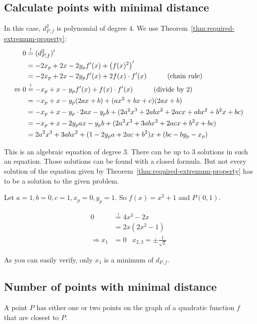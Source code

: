 \subsection{Calculate points with minimal distance}
In this case, $d_{P,f}^2$ is polynomial of degree 4. 
We use Theorem~\ref{thm:required-extremum-property}:\nobreak
\begin{align}
    0     &\overset{!}{=} (d_{P,f}^2)'\\
          &= -2 x_p + 2x -2y_p f'(x) + \left (f(x)^2 \right )'\\
          &= -2 x_p + 2x -2y_p f'(x) + 2 f(x) \cdot f'(x) \rlap{\hspace*{3em}(chain rule)}\label{eq:minimizingFirstDerivative}\\
\Leftrightarrow 0 &\overset{!}{=} -x_p + x -y_p f'(x) + f(x) \cdot f'(x) \rlap{\hspace*{3em}(divide by 2)}\label{eq:minimizingFirstDerivative}\\
          &= -x_p + x -y_p (2ax+b) + (ax^2+bx+c)(2ax+b)\\
          &= -x_p + x -y_p \cdot 2ax- y_p b + (2 a^2 x^3+2 a b x^2+2 a c x+ab x^2+b^2 x+bc)\\
          &= -x_p + x -2y_p ax- y_p b + (2a^2 x^3 + 3 ab x^2 + 2acx + b^2 x + bc)\\
          &= 2a^2 x^3 + 3 ab x^2 + (1 -2y_p a+ 2ac + b^2)x +(bc-by_p-x_p)\label{eq:quadratic-derivative-eq-0}
\end{align}

This is an algebraic equation of degree 3.
There can be up to 3 solutions in such an equation. Those solutions
can be found with a closed formula. But not every solution of the
equation given by Theorem~\ref{thm:required-extremum-property}
has to be a solution to the given problem.

\begin{example}
    Let $a = 1,  b = 0,  c= 1, x_p= 0, y_p = 1$.
    So $f(x) = x^2 + 1$ and $P(0, 1)$.

\begin{align}
    0 &\stackrel{!}{=} 4 x^3 - 2x\\
      &=2x(2x^2 - 1)\\
    \Rightarrow x_1 &= 0 \;\;\; x_{2,3} = \pm \frac{1}{\sqrt{2}}
\end{align}

As you can easily verify, only $x_1$ is a minimum of $d_{P,f}$.
\end{example}


\subsection{Number of points with minimal distance}
\begin{theorem}
    A point $P$ has either one or two points on the graph of a 
    quadratic function $f$ that are closest to $P$.
\end{theorem}


